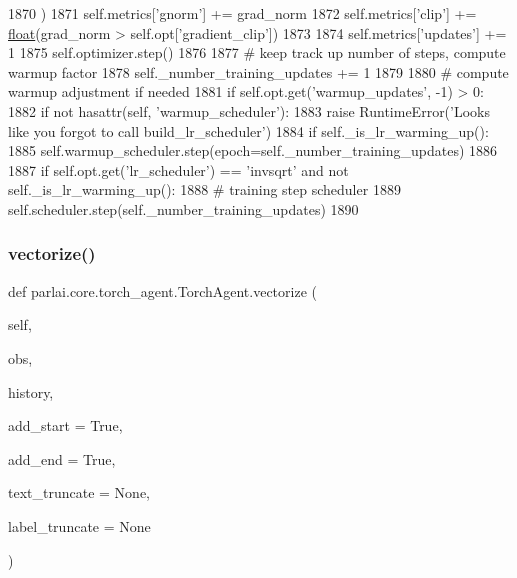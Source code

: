 \begin{DoxyCode}
1870                 )
1871             self.metrics[\textcolor{stringliteral}{'gnorm'}] += grad\_norm
1872             self.metrics[\textcolor{stringliteral}{'clip'}] += \hyperlink{namespaceprojects_1_1controllable__dialogue_1_1make__control__dataset_aa2b7207688c641dbc094ab44eca27113}{float}(grad\_norm > self.opt[\textcolor{stringliteral}{'gradient\_clip'}])
1873 
1874         self.metrics[\textcolor{stringliteral}{'updates'}] += 1
1875         self.optimizer.step()
1876 
1877         \textcolor{comment}{# keep track up number of steps, compute warmup factor}
1878         self.\_number\_training\_updates += 1
1879 
1880         \textcolor{comment}{# compute warmup adjustment if needed}
1881         \textcolor{keywordflow}{if} self.opt.get(\textcolor{stringliteral}{'warmup\_updates'}, -1) > 0:
1882             \textcolor{keywordflow}{if} \textcolor{keywordflow}{not} hasattr(self, \textcolor{stringliteral}{'warmup\_scheduler'}):
1883                 \textcolor{keywordflow}{raise} RuntimeError(\textcolor{stringliteral}{'Looks like you forgot to call build\_lr\_scheduler'})
1884             \textcolor{keywordflow}{if} self.\_is\_lr\_warming\_up():
1885                 self.warmup\_scheduler.step(epoch=self.\_number\_training\_updates)
1886 
1887         \textcolor{keywordflow}{if} self.opt.get(\textcolor{stringliteral}{'lr\_scheduler'}) == \textcolor{stringliteral}{'invsqrt'} \textcolor{keywordflow}{and} \textcolor{keywordflow}{not} self.\_is\_lr\_warming\_up():
1888             \textcolor{comment}{# training step scheduler}
1889             self.scheduler.step(self.\_number\_training\_updates)
1890 
\end{DoxyCode}
\mbox{\label{classparlai_1_1core_1_1torch__agent_1_1TorchAgent_a48bb9b153353a0565ab7253dc1daef99}} 
\subsubsection{\texorpdfstring{vectorize()}{vectorize()}}
{\footnotesize\ttfamily def parlai.\+core.\+torch\+\_\+agent.\+Torch\+Agent.\+vectorize (\begin{DoxyParamCaption}\item[{}]{self,  }\item[{}]{obs,  }\item[{}]{history,  }\item[{}]{add\+\_\+start = {\ttfamily True},  }\item[{}]{add\+\_\+end = {\ttfamily True},  }\item[{}]{text\+\_\+truncate = {\ttfamily None},  }\item[{}]{label\+\_\+truncate = {\ttfamily None} }\end{DoxyParamCaption})}

